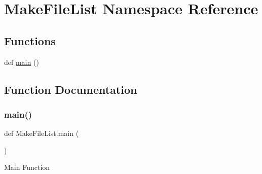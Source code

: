 \hypertarget{namespace_make_file_list}{}\section{Make\+File\+List Namespace Reference}
\label{namespace_make_file_list}
\subsection*{Functions}
\begin{DoxyCompactItemize}
\item 
def \hyperlink{namespace_make_file_list_ad3136cccb0dc8613ad523e5e15d6778d}{main} ()
\end{DoxyCompactItemize}


\subsection{Function Documentation}
\mbox{\label{namespace_make_file_list_ad3136cccb0dc8613ad523e5e15d6778d}} 
\subsubsection{\texorpdfstring{main()}{main()}}
{\footnotesize\ttfamily def Make\+File\+List.\+main (\begin{DoxyParamCaption}{ }\end{DoxyParamCaption})}

\begin{DoxyVerb}Main Function
\end{DoxyVerb}
 